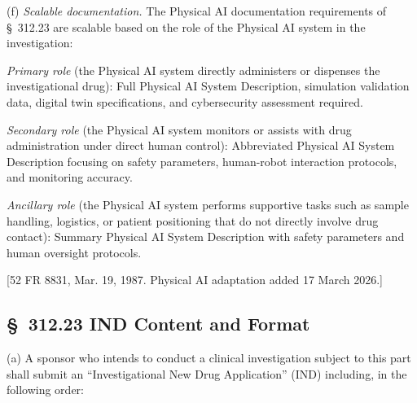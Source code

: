 (f) \textit{Scalable documentation.} The Physical AI documentation requirements of \S~312.23 are scalable based on the role of the Physical AI system in the investigation:

\begin{description}[leftmargin=0.8cm,style=sameline]
\item[(i)] \textit{Primary role} (the Physical AI system directly administers or dispenses the investigational drug): Full Physical AI System Description, simulation validation data, digital twin specifications, and cybersecurity assessment required.
\item[(ii)] \textit{Secondary role} (the Physical AI system monitors or assists with drug administration under direct human control): Abbreviated Physical AI System Description focusing on safety parameters, human-robot interaction protocols, and monitoring accuracy.
\item[(iii)] \textit{Ancillary role} (the Physical AI system performs supportive tasks such as sample handling, logistics, or patient positioning that do not directly involve drug contact): Summary Physical AI System Description with safety parameters and human oversight protocols.
\end{description}

[52 FR 8831, Mar. 19, 1987. Physical AI adaptation added 17 March 2026.]

\subsection{\S~312.23 IND Content and Format}

(a) A sponsor who intends to conduct a clinical investigation subject to this part shall submit an ``Investigational New Drug Application'' (IND) including, in the following order:

